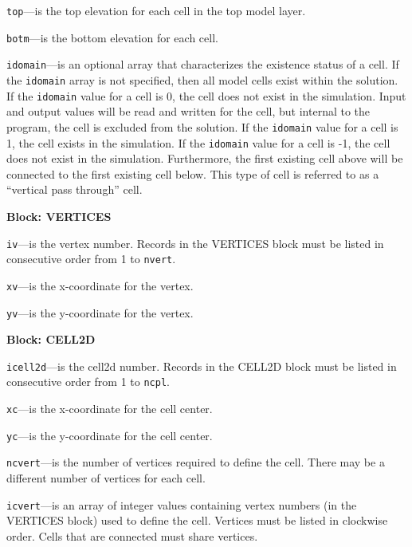 \begin{description}
\item \texttt{top}---is the top elevation for each cell in the top model layer.

\item \texttt{botm}---is the bottom elevation for each cell.

\item \texttt{idomain}---is an optional array that characterizes the existence status of a cell.  If the \texttt{idomain} array is not specified, then all model cells exist within the solution.  If the \texttt{idomain} value for a cell is 0, the cell does not exist in the simulation.  Input and output values will be read and written for the cell, but internal to the program, the cell is excluded from the solution.  If the \texttt{idomain} value for a cell is 1, the cell exists in the simulation.  If the \texttt{idomain} value for a cell is -1, the cell does not exist in the simulation.  Furthermore, the first existing cell above will be connected to the first existing cell below.  This type of cell is referred to as a ``vertical pass through'' cell.

\end{description}
\item \textbf{Block: VERTICES}

\begin{description}
\item \texttt{iv}---is the vertex number.  Records in the VERTICES block must be listed in consecutive order from 1 to \texttt{nvert}.

\item \texttt{xv}---is the x-coordinate for the vertex.

\item \texttt{yv}---is the y-coordinate for the vertex.

\end{description}
\item \textbf{Block: CELL2D}

\begin{description}
\item \texttt{icell2d}---is the cell2d number.  Records in the CELL2D block must be listed in consecutive order from 1 to \texttt{ncpl}.

\item \texttt{xc}---is the x-coordinate for the cell center.

\item \texttt{yc}---is the y-coordinate for the cell center.

\item \texttt{ncvert}---is the number of vertices required to define the cell.  There may be a different number of vertices for each cell.

\item \texttt{icvert}---is an array of integer values containing vertex numbers (in the VERTICES block) used to define the cell.  Vertices must be listed in clockwise order.  Cells that are connected must share vertices.

\end{description}

